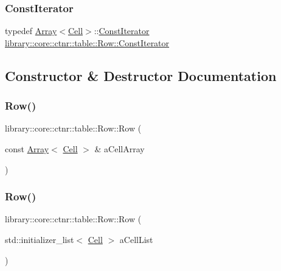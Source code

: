 \subsubsection{\texorpdfstring{ConstIterator}{ConstIterator}}
{\footnotesize\ttfamily typedef \mbox{\hyperlink{classlibrary_1_1core_1_1ctnr_1_1_array}{Array}}$<$\mbox{\hyperlink{namespacelibrary_1_1core_1_1ctnr_1_1table_aac6007d595b2967513e8e6b89f6092f5}{Cell}}$>$\+::\mbox{\hyperlink{classlibrary_1_1core_1_1ctnr_1_1table_1_1_row_a293725deae1bf660d85c2d3ce905cb40}{Const\+Iterator}} \mbox{\hyperlink{classlibrary_1_1core_1_1ctnr_1_1table_1_1_row_a293725deae1bf660d85c2d3ce905cb40}{library\+::core\+::ctnr\+::table\+::\+Row\+::\+Const\+Iterator}}}



\subsection{Constructor \& Destructor Documentation}
\mbox{\label{classlibrary_1_1core_1_1ctnr_1_1table_1_1_row_adec68d43f21630c441416acc5d78d355}} 
\subsubsection{\texorpdfstring{Row()}{Row()}\hspace{0.1cm}{\footnotesize\ttfamily [1/5]}}
{\footnotesize\ttfamily library\+::core\+::ctnr\+::table\+::\+Row\+::\+Row (\begin{DoxyParamCaption}\item[{const \mbox{\hyperlink{classlibrary_1_1core_1_1ctnr_1_1_array}{Array}}$<$ \mbox{\hyperlink{namespacelibrary_1_1core_1_1ctnr_1_1table_aac6007d595b2967513e8e6b89f6092f5}{Cell}} $>$ \&}]{a\+Cell\+Array }\end{DoxyParamCaption})}

\mbox{\label{classlibrary_1_1core_1_1ctnr_1_1table_1_1_row_ae152205e7e611a0940aa1904584302f1}} 
\subsubsection{\texorpdfstring{Row()}{Row()}\hspace{0.1cm}{\footnotesize\ttfamily [2/5]}}
{\footnotesize\ttfamily library\+::core\+::ctnr\+::table\+::\+Row\+::\+Row (\begin{DoxyParamCaption}\item[{std\+::initializer\+\_\+list$<$ \mbox{\hyperlink{namespacelibrary_1_1core_1_1ctnr_1_1table_aac6007d595b2967513e8e6b89f6092f5}{Cell}} $>$}]{a\+Cell\+List }\end{DoxyParamCaption})}

